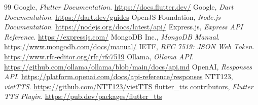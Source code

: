 \documentclass[12pt,a4paper,oneside]{report}
\begin{document}
\begin{thebibliography}{99}
 Google, \textit{Flutter Documentation}. \url{https://docs.flutter.dev/}
 Google, \textit{Dart Documentation}. \url{https://dart.dev/guides}
 OpenJS Foundation, \textit{Node.js Documentation}. \url{https://nodejs.org/docs/latest/api/}
 Express.js, \textit{Express API Reference}. \url{https://expressjs.com/}
 MongoDB Inc., \textit{MongoDB Manual}. \url{https://www.mongodb.com/docs/manual/}
 IETF, \textit{RFC 7519: JSON Web Token}. \url{https://www.rfc-editor.org/rfc/rfc7519}
 Ollama, \textit{Ollama API}. \url{https://github.com/ollama/ollama/blob/main/docs/api.md}
 OpenAI, \textit{Responses API}. \url{https://platform.openai.com/docs/api-reference/responses}
 NTT123, \textit{vietTTS}. \url{https://github.com/NTT123/vietTTS}
 flutter\_tts contributors, \textit{Flutter TTS Plugin}. \url{https://pub.dev/packages/flutter_tts}
\end{thebibliography}
\end{document}
